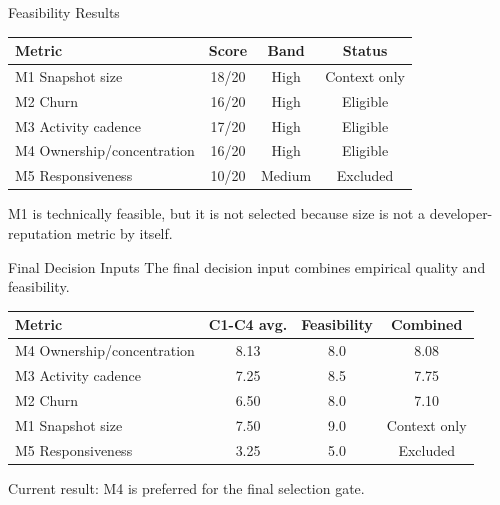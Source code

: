 \documentclass[aspectratio=169,11pt]{beamer}
\begin{document}
\begin{frame}{Feasibility Results}
  \begin{table}
    \footnotesize
    \begin{tabular}{lccc}
      \toprule
      Metric & Score & Band & Status \\
      \midrule
      M1 Snapshot size & 18/20 & High & Context only \\
      M2 Churn & 16/20 & High & Eligible \\
      M3 Activity cadence & 17/20 & High & Eligible \\
      M4 Ownership/concentration & 16/20 & High & Eligible \\
      M5 Responsiveness & 10/20 & Medium & Excluded \\
      \bottomrule
    \end{tabular}
  \end{table}

  \vspace{0.2cm}
  M1 is technically feasible, but it is not selected because size is not a developer-reputation metric by itself.
\end{frame}

\begin{frame}{Final Decision Inputs}
  The final decision input combines empirical quality and feasibility.

  \begin{table}
    \footnotesize
    \begin{tabular}{lccc}
      \toprule
      Metric & C1-C4 avg. & Feasibility & Combined \\
      \midrule
      M4 Ownership/concentration & 8.13 & 8.0 & 8.08 \\
      M3 Activity cadence & 7.25 & 8.5 & 7.75 \\
      M2 Churn & 6.50 & 8.0 & 7.10 \\
      M1 Snapshot size & 7.50 & 9.0 & Context only \\
      M5 Responsiveness & 3.25 & 5.0 & Excluded \\
      \bottomrule
    \end{tabular}
  \end{table}

  \vspace{0.2cm}
  Current result: M4 is preferred for the final selection gate.
\end{frame}
\end{document}
